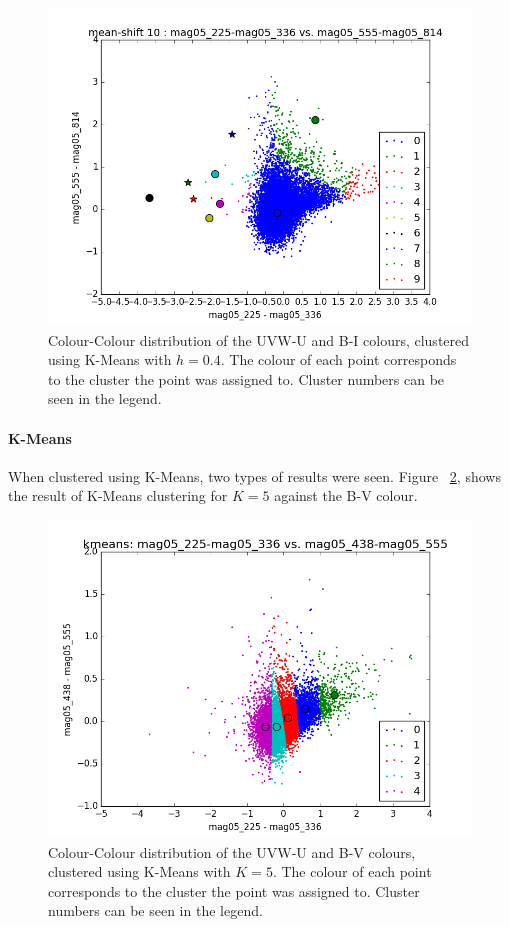 \begin{figure}
\centering
\includegraphics[width=\linewidth]{figs/meanshift_color_10cl_mag05_225-mag05_336vsmag05_555-mag05_814}
\caption{Colour-Colour distribution of the UVW-U and B-I colours, clustered using K-Means with $h=0.4$. The colour of each point corresponds to the cluster the point was assigned to. Cluster numbers can be seen in the legend.}
\label{fig:UVWMS2}
\end{figure}

\paragraph{K-Means}

When clustered using K-Means, two types of results were seen.
Figure ~\ref{fig:UVWKM1}, shows the result of K-Means clustering for $K=5$ against the B-V colour.

\begin{figure}
\centering
\includegraphics[width=\linewidth]{figs/kmeans_xy_5cl_mag05_225-mag05_336vsmag05_438-mag05_555}
\caption{Colour-Colour distribution of the UVW-U and B-V colours, clustered using K-Means with $K=5$. The colour of each point corresponds to the cluster the point was assigned to. Cluster numbers can be seen in the legend.}
\label{fig:UVWKM1}
\end{figure}

